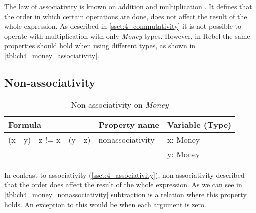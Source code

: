 The law of associativity is known on addition and multiplication \cite{baumgart1961axioms}. It defines that the order in which certain operations are done, does not affect the result of the whole expression. As described in \autoref{ssct:4_commutativity} it is not possible to operate with multiplication with only \textit{Money} types. However, in Rebel the same properties should hold when using different types, as shown in \autoref{tbl:ch4_money_associativity}.

\subsection{Non-associativity}
\begin{table}[h!]
\centering
\begin{tabular}{|lll|}
\hline
                        \textbf{Formula}           & \textbf{Property name} & \textbf{Variable (Type)} \\ \hline
\rowcolor[HTML]{EFEFEF} (x - y) - z != x - (y - z) & nonassociativity       & x: Money                 \\
\rowcolor[HTML]{EFEFEF}                            &                        & y: Money                 \\ \hline
\end{tabular}
\caption{Non-associativity on \textit{Money}}
\label{tbl:ch4_money_nonassociativity}
\end{table}
In contrast to associativity (\autoref{ssct:4_associativity}), non-associativity described that the order does affect the result of the whole expression. As we can see in \autoref{tbl:ch4_money_nonassociativity} subtraction is a relation where this property holds. An exception to this would be when each argument is zero.

